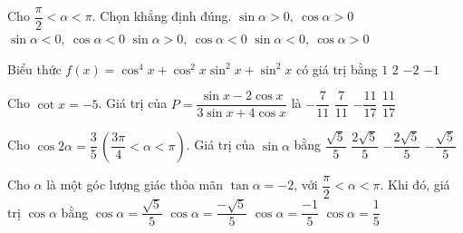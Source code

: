 \begin{ex}%
	Cho $\dfrac{\pi}{2}<\alpha<\pi$. Chọn khẳng định đúng.
	\choice
	{$\sin{\alpha}>0,\ \cos{\alpha}>0$}
	{$\sin{\alpha}<0,\ \cos{\alpha}<0$}
	{\True $\sin{\alpha}>0,\ \cos{\alpha}<0$}
	{$\sin{\alpha}<0,\ \cos{\alpha}>0$}
\end{ex}
\begin{ex}%
	Biểu thức $f(x)=\cos^4{x}+\cos^2{x}\sin^2{x}+\sin^2{x}$ có giá trị bằng
	\choice
	{\True $1$}
	{$2$}
	{$-2$}
	{$-1$}
\end{ex}
\begin{ex}%
	Cho $\cot x=-5$. Giá trị của $P=\dfrac{\sin x-2\cos x}{3\sin x+4\cos x}$ là
	\choice
	{$-\dfrac{7 }{11}$}
	{$\dfrac{ 7}{11}$}
	{\True $-\dfrac{11 }{17}$}
	{$\dfrac{11}{17}$}
\end{ex}

\begin{ex}%
	Cho $ \cos 2\alpha=\dfrac{3}{5}\,\left(\dfrac{3\pi}{4}<\alpha<\pi\right) $.  Giá trị của $ \sin \alpha $ bằng
	\choice
	{\True $ \dfrac{\sqrt{5}}{5} $}
	{$ \dfrac{2\sqrt{5}}{5} $}
	{$ -\dfrac{2\sqrt{5}}{5} $}
	{$ -\dfrac{\sqrt{5}}{5} $}
\end{ex}

\begin{ex}%
	Cho $\alpha$ là một góc lượng giác thỏa mãn $\tan \alpha=-2$, với $\dfrac{\pi}{2}<\alpha<\pi$. Khi đó, giá trị $\cos \alpha$ bằng
	\choice
	{$\cos \alpha=\dfrac{\sqrt{5}}{5}$}
	{\True $\cos \alpha=\dfrac{-\sqrt{5}}{5}$}
	{$\cos \alpha=\dfrac{-1}{5}$}
	{$\cos \alpha=\dfrac{1}{5}$}
\end{ex}

